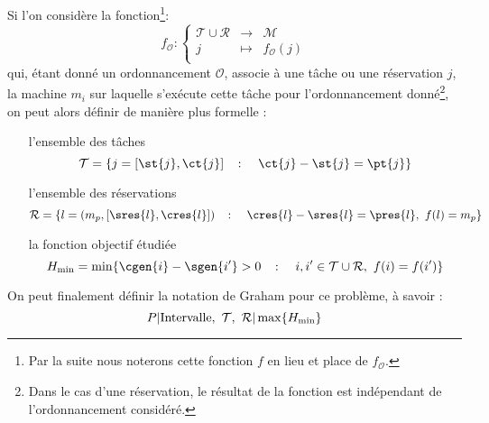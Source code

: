 \documentclass[a4paper,11pt]{thesis}
\begin{document}
\begin{nrmq}
    Si l'on considère la fonction\footnote{Par la suite nous noterons cette fonction $f$ en lieu et
    place de $f_{\mathcal{O}}$.}: \[
        f_{\mathcal{O}} : \left \lbrace \begin{array}{rcl}
            \mathcal{T} \cup \mathcal{R} & \longrightarrow & \mathcal{M} \\
            j & \mapsto & f_{\mathcal{O}}(j) \\
        \end{array}
        \right .
    \]
    qui, étant donné un ordonnancement $\mathcal{O}$, associe à une tâche ou une réservation $j$, la
    machine $m_i$ sur laquelle s'exécute cette tâche pour l'ordonnancement donné\footnote{Dans le
    cas d'une réservation, le résultat de la fonction est indépendant de l'ordonnancement
    considéré.}, on peut alors définir de manière plus formelle : \begin{itemize}
        \item[l'ensemble des tâches] \[
                \mathcal{T} = \{j = [\st{j}, \ct{j}] \quad \colon \quad \ct{j} - \st{j} = \pt{j} \}
            \]
        \item[l'ensemble des réservations] \[
                \mathcal{R} = \{l = (m_p, [\sres{l}, \cres{l}]) \quad \colon \quad \cres{l} -
                \sres{l} = \pres{l},\ f(l) = m_p\}
            \]
        \item[la fonction objectif étudiée] \[
                H_{\min} = \min \{ \cgen{i} - \sgen{i'} > 0 \quad \colon \quad i,i' \in
                \mathcal{T} \cup \mathcal{R},\ f(i) = f(i')\}
            \]
    \end{itemize}

    On peut finalement définir la notation de Graham pour ce problème, à savoir : \[
        P \arrowvert \mbox{Intervalle},\ \mathcal{T},\ \mathcal{R} \arrowvert \max\{H_{\min}\}
    \]
\end{nrmq}
\end{document}
